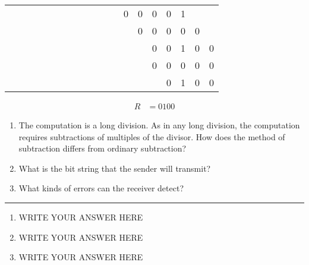 \documentclass[twoside]{article}
\newenvironment{answer}
  {\vspace*{0.2cm} \rule{12cm}{0.04cm} \vspace*{0.2cm}}
  {\vspace*{0.2cm}}
\begin{document}
\begin{enumerate}
\begin{tabular}{lllll|llllllllllllll}
      &   &   &   &   &   &   &   &   &   &   &   & 0 & 0 & 0 & 0 & 1 &   &    \\ 
      &   &   &   &   &   &   &   &   &   &   &   &   & 0 & 0 & 0 & 0 & 0 &    \\ \hline
      &   &   &   &   &   &   &   &   &   &   &   &   &   & 0 & 0 & 1 & 0 & 0  \\
      &   &   &   &   &   &   &   &   &   &   &   &   &   & 0 & 0 & 0 & 0 & 0  \\ \hline  
      &   &   &   &   &   &   &   &   &   &   &   &   &   &   & 0 & 1 & 0 & 0  
    \end{tabular}

  \begin{align*}
    R & = 0100
    \end{align*}

  \begin{enumerate}
    \item The computation is a long division. As in any long division, the computation
      requires subtractions of multiples of the divisor. How does the method of subtraction
      differs from ordinary subtraction? 
    \item What is the bit string that the sender will transmit?
    \item What kinds of errors can the receiver detect?
    \end{enumerate}

  \begin{answer}

  \begin{enumerate}
    \item WRITE YOUR ANSWER HERE
    \item WRITE YOUR ANSWER HERE
    \item WRITE YOUR ANSWER HERE
    \end{enumerate}

    \end{answer}

  \end{enumerate}
\end{document}
